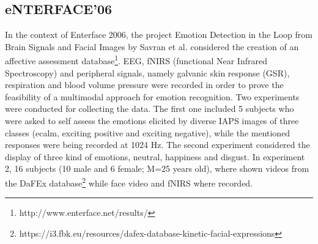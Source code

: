 \documentclass{sig-alternate}
\begin{document}
\subsection{eNTERFACE'06}
In the context of Enterface 2006, the project Emotion Detection in the Loop from Brain Signals and Facial Images by Savran et al. \cite{enterface06} considered the creation of an affective assessment database\footnote{http://www.enterface.net/results/}. EEG, fNIRS (functional Near Infrared Spectroscopy) and peripheral signals, namely galvanic skin response (GSR), respiration and blood volume pressure were recorded in order to prove the feasibility of a multimodal approach for emotion recognition. Two experiments were conducted for collecting the data. The first one included 5 subjects who were asked to self assess the emotions elicited by diverse IAPS images of three classes (ecalm, exciting positive and exciting negative), while the mentioned responses were being recorded at 1024 Hz. The second experiment considered the display of three kind of emotions, neutral, happiness and disgust. In experiment 2, 16 subjects (10 male and 6 female; M=25 years old), where shown videos from the DaFEx database\footnote{https://i3.fbk.eu/resources/dafex-database-kinetic-facial-expressions} while face video and fNIRS where recorded.





    
\end{document}
